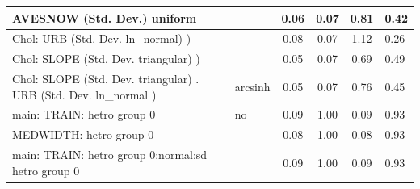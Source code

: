 \begin{table}
\begin{center}
\begin{tabular}{|l|l|c|c|c|l|}
			\hline
			AVESNOW (Std. Dev.) uniform &  & 0.06 & 0.07 & 0.81 & 0.42 \\
			\hline
			 Chol: URB (Std. Dev. ln_normal) ) &  & 0.08 & 0.07 & 1.12 & 0.26 \\
			\hline
			 Chol: SLOPE (Std. Dev. triangular) ) &  & 0.05 & 0.07 & 0.69 & 0.49 \\
			\hline
			 Chol: SLOPE (Std. Dev. triangular) . URB (Std. Dev.   ln_normal ) & arcsinh & 0.05 & 0.07 & 0.76 & 0.45 \\
			\hline
			main: TRAIN: hetro group 0 & no & 0.09 & 1.00 & 0.09 & 0.93 \\
			\hline
			MEDWIDTH: hetro group 0 &  & 0.08 & 1.00 & 0.08 & 0.93 \\
			\hline
			main: TRAIN: hetro group 0:normal:sd  hetro group 0 &  & 0.09 & 1.00 & 0.09 & 0.93 \\
			\hline
		\end{tabular}
	\end{center}
\end{table}
